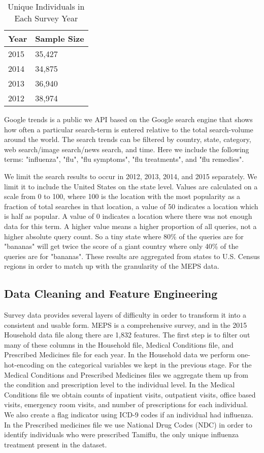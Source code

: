 \documentclass[twoside,11pt]{article}
\begin{document}
\begin{table}[h]
\centering
\caption{Unique Individuals in Each Survey Year}
\begin{tabular}{ll}
\hline
Year & Sample Size\\ \hline
2015 & 35,427\\
2014 & 34,875\\
2013 & 36,940\\
2012 & 38,974\\
\end{tabular}
\end{table}

Google trends is a public we API based on the Google search engine that shows how often a particular search-term is entered relative to the total search-volume around the world.  The search trends can be filtered by country, state, category, web search/image search/news search, and time. Here we include the following terms: "influenza", "flu", "flu symptoms", "flu treatments", and "flu remedies".

We limit the search results to occur in 2012, 2013, 2014, and 2015 separately.  We limit it to include the United States on the state level.  Values are calculated on a scale from 0 to 100, where 100 is the location with the most popularity as a fraction of total searches in that location, a value of 50 indicates a location which is half as popular. A value of 0 indicates a location where there was not enough data for this term.  A higher value means a higher proportion of all queries, not a higher absolute query count. So a tiny state where 80\% of the queries are for "bananas" will get twice the score of a giant country where only 40\% of the queries are for "bananas".  These results are aggregated from states to U.S. Census regions in order to match up with the granularity of the MEPS data.

\subsection{Data Cleaning and Feature Engineering}

Survey data provides several layers of difficulty in order to transform it into a consistent and usable form. MEPS is a comprehensive survey, and in the 2015 Household data file along there are 1,832 features.  The first step is to filter out many of these columns in the Household file, Medical Conditions file, and Prescribed Medicines file for each year. In the Household data we perform one-hot-encoding on the categorical variables we kept in the previous stage.  For the Medical Conditions and Prescribed Medicines files we aggregate them up from the condition and prescription level to the individual level.  In the Medical Conditions file we obtain counts of inpatient visits, outpatient visits, office based visits, emergency room visits, and number of prescriptions for each individual.  We also create a flag indicator using ICD-9 codes if an individual had influenza.  In the Prescribed medicines file we use National Drug Codes (NDC) in order to identify individuals who were prescribed Tamiflu, the only unique influenza treatment present in the dataset.  
\end{document}
